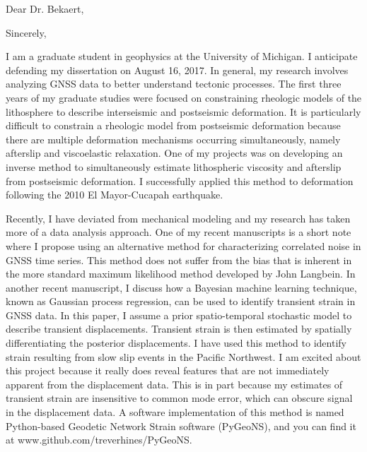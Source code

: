 \documentclass[11pt,a4paper,sans]{moderncv}
\begin{document}
\date{June 28, 2017}
\opening{Dear Dr. Bekaert,}
\closing{Sincerely,}
\makelettertitle

I am a graduate student in geophysics at the University of Michigan. I anticipate defending my dissertation on August 16, 2017. In general, my research involves analyzing GNSS data to better understand tectonic processes. The first three years of my graduate studies were focused on constraining rheologic models of the lithosphere to describe interseismic and postseismic deformation. It is particularly difficult to constrain a rheologic model from postseismic deformation because there are multiple deformation mechanisms occurring simultaneously, namely afterslip and viscoelastic relaxation. One of my projects was on developing an inverse method to simultaneously estimate lithospheric viscosity and afterslip from postseismic deformation. I successfully applied this method to deformation following the 2010 El Mayor-Cucapah earthquake.

Recently, I have deviated from mechanical modeling and my research has taken more of a data analysis approach. One of my recent manuscripts is a short note where I propose using an alternative method for characterizing correlated noise in GNSS time series. This method does not suffer from the bias that is inherent in the more standard maximum likelihood method developed by John Langbein. In another recent manuscript, I discuss how a Bayesian machine learning technique, known as Gaussian process regression, can be used to identify transient strain in GNSS data. In this paper, I assume a prior spatio-temporal stochastic model to describe transient displacements. Transient strain is then estimated by spatially differentiating the posterior displacements. I have used this method to identify strain resulting from slow slip events in the Pacific Northwest. I am excited about this project because it really does reveal features that are not immediately apparent from the displacement data. This is in part because my estimates of transient strain are insensitive to common mode error, which can obscure signal in the displacement data. A software implementation of this method is named Python-based Geodetic Network Strain software (PyGeoNS), and you can find it at www.github.com/treverhines/PyGeoNS.       
\end{document}
